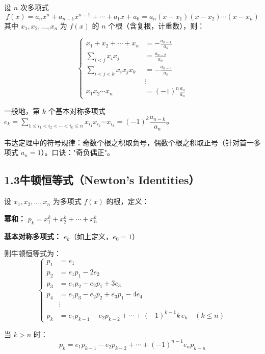 \documentclass[12pt, a4paper]{ctexart}
\begin{document}
\begin{knowledgebox}[韦达定理的一般形式]
设 $n$ 次多项式
\[
f(x) = a_n x^n + a_{n-1} x^{n-1} + \cdots + a_1 x + a_0 = a_n(x - x_1)(x - x_2)\cdots(x - x_n)
\]
其中 $x_1, x_2, \ldots, x_n$ 为 $f(x)$ 的 $n$ 个根（含复根，计重数），则：

\[
\left\{
\begin{aligned}
x_1 + x_2 + \cdots + x_n &= -\frac{a_{n-1}}{a_n} \\[6pt]
\sum_{i<j} x_i x_j &= \frac{a_{n-2}}{a_n} \\[6pt]
\sum_{i<j<k} x_i x_j x_k &= -\frac{a_{n-3}}{a_n} \\[6pt]
&\vdots \\[4pt]
x_1 x_2 \cdots x_n &= (-1)^n \frac{a_0}{a_n}
\end{aligned}
\right.
\]

一般地，第 $k$ 个基本对称多项式 $e_k = \sum_{1 \leq i_1 < i_2 < \cdots < i_k \leq n} x_{i_1} x_{i_2} \cdots x_{i_k} = (-1)^k \dfrac{a_{n-k}}{a_n}$。
\end{knowledgebox}

\begin{warnbox}[易错提醒]
韦达定理中的符号规律：奇数个根之积取负号，偶数个根之积取正号（针对首一多项式 $a_n=1$）。口诀："奇负偶正"。
\end{warnbox}

\subsection*{1.3\quad 牛顿恒等式（Newton's Identities）}

\begin{knowledgebox}[牛顿恒等式]
设 $x_1, x_2, \ldots, x_n$ 为多项式 $f(x)$ 的根，定义：

\textbf{幂和：} $p_k = x_1^k + x_2^k + \cdots + x_n^k$

\textbf{基本对称多项式：} $e_k$（如上定义，$e_0=1$）

则牛顿恒等式为：
\[
\left\{
\begin{aligned}
p_1 &= e_1 \\
p_2 &= e_1 p_1 - 2e_2 \\
p_3 &= e_1 p_2 - e_2 p_1 + 3e_3 \\
p_4 &= e_1 p_3 - e_2 p_2 + e_3 p_1 - 4e_4 \\
&\vdots \\
p_k &= e_1 p_{k-1} - e_2 p_{k-2} + \cdots + (-1)^{k-1} k \, e_k \quad (k \leq n)
\end{aligned}
\right.
\]

当 $k > n$ 时：
\[
p_k = e_1 p_{k-1} - e_2 p_{k-2} + \cdots + (-1)^{n-1} e_n p_{k-n}
\]
\end{knowledgebox}
\end{document}
